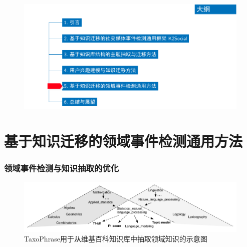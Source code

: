 \begin{withoutheadline}
\begin{frame}
\vspace*{-13mm}
\begin{figure}
	\hspace*{-4.2mm}
    \includegraphics[width=1.0\paperwidth]{img/contents5_output.pdf}
\end{figure}

\end{frame}
\end{withoutheadline}

\section{基于知识迁移的领域事件检测通用方法}

\begin{frame}
\frametitle{领域事件检测与知识抽取的优化}	

\begin{figure}
	\caption{TaxoPhrase用于从维基百科知识库中抽取领域知识的示意图}
    \includegraphics[width=1.0\textwidth]{img/TD+/taxophrase_motivation.pdf}
\end{figure}
\end{frame}

